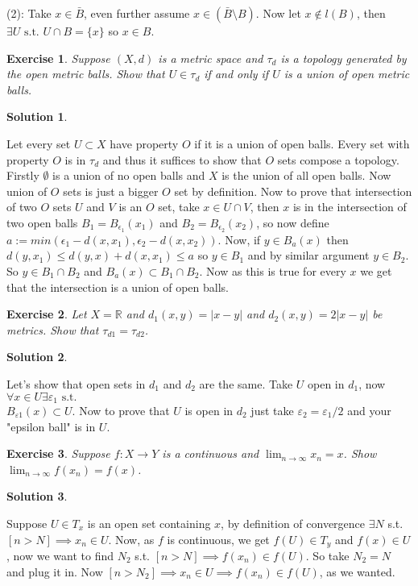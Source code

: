 \documentclass[11pt,a4paper]{article}
\newtheorem{Ex}{Exercise}
\newtheorem{Sol}{Solution}
\begin{document}
\noindent(2): Take $x \in \bar{B}$, even further assume $x \in (\bar{B} \setminus B)$. Now let $x \not\in l(B)$, then $\exists U \text{ s.t. } U\cap B =\{x\}$ so $x \in B$. \\

\begin{Ex}
	Suppose $(X, d)$ is a metric space and $\tau_d$ is a topology generated by the open metric balls. Show that $U \in \tau_d$ if and only if $U$ is a union of open metric balls.
\end{Ex}

\begin{Sol} \end{Sol}
\noindent Let every set $U \subset X$ have property $O$ if it is a union of open balls. Every set with property $O$ is in $\tau_d$ and thus it suffices to show that $O$ sets compose a topology. Firstly $\emptyset$ is a union of no open balls and $X$ is the union of all open balls. Now union of $O$ sets is just a bigger $O$ set by definition. Now to prove that intersection of two $O$ sets $U$ and $V$ is an $O$ set, take $x \in U \cap V$, then $x$ is in the intersection of two open balls $B_1 =B_{\epsilon_1}(x_1)$ and $B_2 =B_{\epsilon_2}(x_2)$, so now define $a := min(\epsilon_1 - d(x,x_1), \epsilon_2 - d(x,x_2))$. Now, if $y \in B_a(x)$ then $d(y,x_1) \le d(y,x) + d(x,x_1) \le a$ so $y \in B_1$ and by similar argument $y \in B_2$. So $y \in  B_1 \cap B_2$ and $B_a(x) \subset B_1 \cap B_2$. Now as this is true for every $x$ we get that the intersection is a union of open balls.

\begin{Ex}
	Let $X = \mathbb{R}$ and $d_1(x,y) = |x-y|$ and $d_2(x,y) = 2|x-y|$ be metrics. Show that $\tau_{d1} = \tau_{d2}$. 
\end{Ex}

\begin{Sol} \end{Sol}
\noindent Let's show that open sets in $d_1$ and $d_2$ are the same. Take $U$ open in $d_1$, now $\forall x \in U \exists \varepsilon_1 \text{ s.t. }$ \\$B_{\varepsilon1}(x) \subset U$. Now to prove that $U$ is open in $d_2$ just take $\varepsilon_2 = \varepsilon_1/2$ and your "epsilon ball" is in $U$. 

\begin{Ex}
	Suppose $f: X \rightarrow Y$ is a continuous and $\lim_{n \rightarrow \infty}x_n = x$. Show $\lim_{n \rightarrow \infty}f(x_n) = f(x)$.
\end{Ex}
\begin{Sol} \end{Sol} 
\noindent Suppose $U \in T_x$ is an open set containing $x$, by definition of convergence $\exists N$ s.t. $[n > N] \implies x_n \in U$. Now, as $f$ is continuous, we get $f(U) \in T_y$ and $f(x) \in U$, now we want to find $N_2$ s.t. $[n > N] \implies f(x_n) \in f(U)$. So take $N_2 = N$ and plug it in. Now $[n > N_2] \implies x_n \in U \implies f(x_n) \in f(U)$, as we wanted. \\
\end{document}

